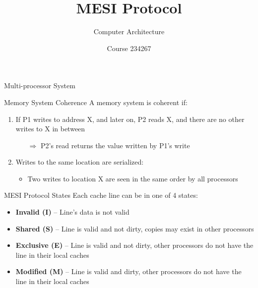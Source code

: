 \documentclass[aspectratio=169,12pt]{beamer}
\title{MESI Protocol}
\subtitle{Computer Architecture}
\author{Course 234267}
\date{}
\begin{document}
\frame{\titlepage}

\begin{frame}{Multi-processor System}
\begin{block}{Memory System Coherence}
A memory system is coherent if:
\end{block}

\begin{enumerate}
\item If P1 writes to address X, and later on, P2 reads X, and there are no other writes to X in between
    \begin{itemize}
    \item[$\Rightarrow$] P2's read returns the value written by P1's write
    \end{itemize}
\item Writes to the same location are serialized:
    \begin{itemize}
    \item Two writes to location X are seen in the same order by all processors
    \end{itemize}
\end{enumerate}

\vspace{1em}
\begin{center}
\end{center}
\end{frame}

\begin{frame}{MESI Protocol States}
Each cache line can be in one of 4 states:

\begin{itemize}
\item \textbf{Invalid (I)} -- Line's data is not valid
\vspace{0.5em}
\item \textbf{Shared (S)} -- Line is valid and not dirty, copies may exist in other processors
\vspace{0.5em}
\item \textbf{Exclusive (E)} -- Line is valid and not dirty, other processors do not have the line in their local caches
\vspace{0.5em}
\item \textbf{Modified (M)} -- Line is valid and dirty, other processors do not have the line in their local caches
\end{itemize}
\end{frame}
\end{document}
